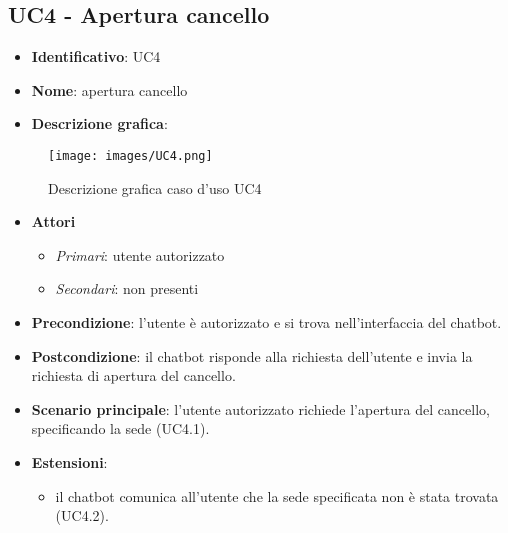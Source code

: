 \subsection{UC4 - Apertura cancello}
\begin{itemize}
    \item \textbf{Identificativo}: UC4
    \item \textbf{Nome}: apertura cancello
    \item \textbf{Descrizione grafica}:
\end{itemize}

\begin{figure}[h]
   \centering
   \texttt{[image: images/UC4.png]} 
   \caption{Descrizione grafica caso d'uso UC4}
\end{figure}


 \begin{itemize}
    \item \textbf{Attori}
 \begin{itemize} 
    \item \textit{Primari}: utente autorizzato
    \item \textit{Secondari}: non presenti
 \end{itemize}
 \item \textbf{Precondizione}: l'utente è autorizzato e si trova nell'interfaccia del chatbot.
 \item \textbf{Postcondizione}: il chatbot risponde alla richiesta dell'utente e invia la richiesta di apertura del cancello.
 \item \textbf{Scenario principale}: l'utente autorizzato richiede l'apertura del cancello, specificando la sede (UC4.1).
 \item \textbf{Estensioni}: 
 \begin{itemize} 
    \item il chatbot comunica all'utente che la sede specificata non è stata trovata (UC4.2).
 \end{itemize}
\end{itemize}
\newpage

